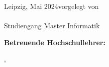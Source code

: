 \begin{titlepage}
\begin{center}
		\renewcommand{\arraystretch}{1}
  \end{center}
  
Leipzig, Mai 2024\hfill vorgelegt von \\[3mm]
\hspace*{\fill} {\large \myfirstname~\mylastname}\\
\hspace*{\fill} Studiengang Master Informatik

\vspace{1cm}

{\large\textbf{Betreuende Hochschullehrer:}}
%
%
%


\quad \myuni, \myworkinggroup
  \makeatother
\end{titlepage}

\newpage
\null
\thispagestyle{empty}
\newpage
